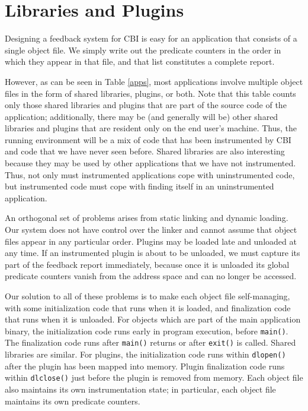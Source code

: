 \documentclass[times,10pt,twocolumn]{article}
\begin{document}
\section{Libraries and Plugins}

Designing a feedback system for CBI is easy for an application that consists of
a single object file.  We simply write out the predicate counters in the
order in which they appear in that file, and that list constitutes a complete
report.

However, as can be seen in Table \ref{apps}, most applications involve
multiple object files in the form of shared libraries, plugins, or
both.  Note that this table counts only those shared libraries and
plugins that are part of the source code of the application;
additionally, there may be (and generally will be) other shared
libraries and plugins that are resident only on the end user's
machine.  Thus, the running environment will be a mix of code that has
been instrumented by CBI and code that we have never seen before.
Shared libraries are also interesting because they may be used by
other applications that we have not instrumented.  Thus, not only must
instrumented applications cope with uninstrumented code, but
instrumented code must cope with finding itself in an
uninstrumented application.

An orthogonal set of problems arises from static linking and dynamic
loading.  Our system does not have control over the linker and
cannot assume that object files appear in any particular order.
Plugins may be loaded late and unloaded at any time.  If an
instrumented plugin is about to be unloaded, we must capture its part
of the feedback report immediately, because once it is unloaded its
global predicate counters vanish from the address space and can no
longer be accessed.

Our solution to all of these problems is to make each object file
self-managing, with some initialization code that runs when it is
loaded, and finalization code that runs when it is unloaded.  For
objects which are part of the main application binary, the
initialization code runs early in program execution, before
\texttt{main()}.  The finalization code runs after \texttt{main()}
returns or after \texttt{exit()} is called.  Shared libraries are
similar.  For plugins, the initialization code runs within
\texttt{dlopen()} after the plugin has been mapped into memory.
Plugin finalization code runs within \texttt{dlclose()} just before
the plugin is removed from memory.  Each object file also maintains
its own instrumentation state; in particular, each object file maintains
its own predicate counters.
\end{document}
